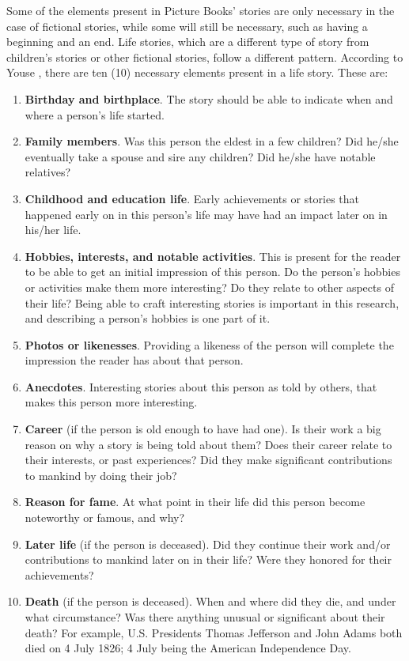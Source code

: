 Some of the elements present in Picture Books' stories are only necessary in the case of fictional stories, while some will still be necessary, such as having a beginning and an end. Life stories, which are a different type of story from children's stories or other fictional stories, follow a different pattern. According to Youse \citeyear{Youse2005}, there are ten (10) necessary elements present in a life story. These are:
\begin{enumerate}
\item \textbf{Birthday and birthplace}. The story should be able to indicate when and where a person's life started.
\item \textbf{Family members}. Was this person the eldest in a few children? Did he/she eventually take a spouse and sire any children? Did he/she have notable relatives?
\item \textbf{Childhood and education life}. Early achievements or stories that happened early on in this person's life may have had an impact later on in his/her life.
\item \textbf{Hobbies, interests, and notable activities}. This is present for the reader to be able to get an initial impression of this person. Do the person's hobbies or activities make them more interesting? Do they relate to other aspects of their life? Being able to craft interesting stories is important in this research, and describing a person's hobbies is one part of it.
\item \textbf{Photos or likenesses}. Providing a likeness of the person will complete the impression the reader has about that person.
\item \textbf{Anecdotes}. Interesting stories about this person as told by others, that makes this person more interesting.
\item \textbf{Career} (if the person is old enough to have had one). Is their work a big reason on why a story is being told about them? Does their career relate to their interests, or past experiences? Did they make significant contributions to mankind by doing their job?
\item \textbf{Reason for fame}. At what point in their life did this person become noteworthy or famous, and why?
\item \textbf{Later life} (if the person is deceased). Did they continue their work and/or contributions to mankind later on in their life? Were they honored for their achievements?
\item \textbf{Death} (if the person is deceased). When and where did they die, and under what circumstance? Was there anything unusual or significant about their death? For example, U.S. Presidents Thomas Jefferson and John Adams both died on 4 July 1826; 4 July being the American Independence Day.
\end{enumerate}


